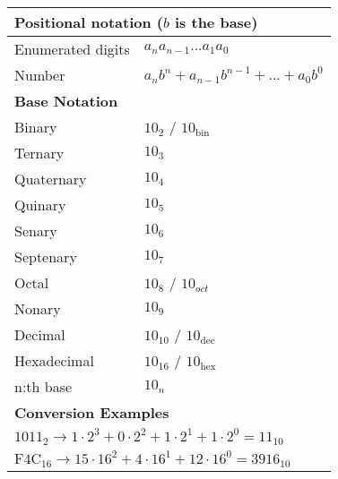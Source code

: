 \documentclass[11pt,a4paper]{article}
\begin{document}
\begin{table}[H]
\begin{tabular}{ll} \midrule
\multicolumn{2}{l}{\textbf{Positional notation} ($b$ is the base)}\\ \midrule
Enumerated digits 	& $a_{n} a_{n-1}...a_{1} a_{0}$ \\ 
Number 				& $a_{n} b^{n} + a_{n-1} b^{n-1} + ... + a_{0} b^{0}$ \\ \midrule

\multicolumn{2}{l}{\textbf{Base Notation}}\\ \midrule
Binary		& $10_{2}$ / $10_{\text{bin}}$ \\
Ternary		& $10_{3}$ \\
Quaternary	& $10_{4}$ \\
Quinary		& $10_{5}$ \\
Senary		& $10_{6}$ \\
Septenary	& $10_{7}$ \\ 
Octal		& $10_{8} $ / $ 10_{oct}$ \\
Nonary		& $10_{9}$ \\
Decimal 	& $10_{10}$ / $10_{\text{dec}}$ \\
Hexadecimal & $10_{16}$ / $10_{\text{hex}}$\\
n:th base 	& $10_{n}$ \\ \midrule
\multicolumn{2}{l}{\textbf{Conversion Examples}}\\ \midrule

\multicolumn{2}{l}{$1011_{2} \rightarrow 1 \cdot 2^{3} + 0 \cdot 2^{2} + 1 \cdot 2^{1} + 1 \cdot 2^{0} = 11_{10}$}\\
\multicolumn{2}{l}{$\text{F}4\text{C}_{16} \rightarrow 15 \cdot 16^{2} + 4 \cdot 16^{1} + 12 \cdot 16^{0} = 3916_{10}$} \\ \midrule


\end{tabular}
\end{table}
\end{document}
